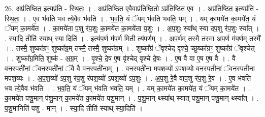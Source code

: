 \documentclass[17pt]{extarticle}
\begin{document}
26. अप्र॑तिष्ठित॒ इत्यप्र॑ति - स्थि॒तः॒ । . अप्र॑तिष्ठित ए॒वैवाप्र॑तिष्ठि॒तो ऽप्र॑तिष्ठित ए॒व । . अप्र॑तिष्ठित॒ इत्यप्र॑ति - स्थि॒तः॒ । . ए॒व भ॑वति भव त्ये॒वैव भ॑वति । . भ॒व॒ति॒ यं ॅयम् भ॑वति भवति॒ यम् । . यम् का॒मये॑त का॒मये॑त॒ यं ॅयम् का॒मये॑त । . का॒मये॑ता प॒शु र॑प॒शुः का॒मये॑त का॒मये॑ता प॒शुः । . अ॒प॒शुः स्या᳚थ् स्या दप॒शु र॑प॒शुः स्या᳚त् । . स्या॒दि तीति॑ स्याथ् स्या॒ दिति॑ । . इत्य॑प॒र्ण म॑प॒र्ण मिती त्य॑प॒र्णम् । . अ॒प॒र्णम् तस्मै॒ तस्मा॑ अप॒र्ण म॑प॒र्णम् तस्मै᳚ । . तस्मै॒ शुष्का᳚ग्रꣳ॒॒ शुष्का᳚ग्र॒म् तस्मै॒ तस्मै॒ शुष्का᳚ग्रम् । . शुष्का᳚ग्रं ॅवृश्चेद् वृश्चे॒ च्छुष्का᳚ग्रꣳ॒॒ शुष्का᳚ग्रं ॅवृश्चेत् । . शुष्का᳚ग्र॒मिति॒ शुष्क॑ - अ॒ग्र॒म् । . वृ॒श्चे॒ दे॒ष ए॒ष वृ॑श्चेद् वृश्चे दे॒षः । . ए॒ष वै वा ए॒ष ए॒ष वै । . वै वन॒स्पती॑नां॒ ॅवन॒स्पती॑नां॒ ॅवै वै वन॒स्पती॑नाम् । . वन॒स्पती॑ना मपश॒व्यो॑ ऽपश॒व्यो वन॒स्पती॑नां॒ ॅवन॒स्पती॑ना मपश॒व्यः । . अ॒प॒श॒व्यो॑ ऽप॒शु र॑प॒शु र॑पश॒व्यो॑ ऽपश॒व्यो॑ ऽप॒शुः । . अ॒प॒शु रे॒वै वाप॒शु र॑प॒शु रे॒व । . ए॒व भ॑वति भव त्ये॒वैव भ॑वति । . भ॒व॒ति॒ यं ॅयम् भ॑वति भवति॒ यम् । . यम् का॒मये॑त का॒मये॑त॒ यं ॅयम् का॒मये॑त । . का॒मये॑त पशु॒मान् प॑शु॒मान् का॒मये॑त का॒मये॑त पशु॒मान् । . प॒शु॒मान् थ्स्या᳚थ् स्यात् पशु॒मान् प॑शु॒मान् थ्स्या᳚त् । . प॒शु॒मानिति॑ पशु - मान् । . स्या॒दि तीति॑ स्याथ् स्या॒दिति॑ । \newline
\end{document}
